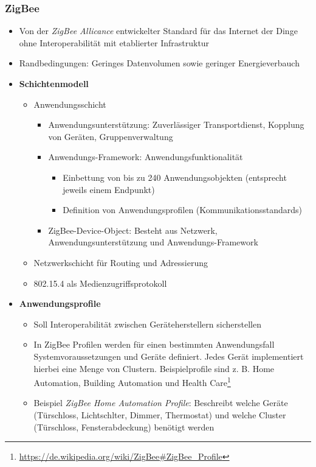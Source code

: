 \subsubsection{ZigBee}
\begin{itemize}
	\item Von der \textit{ZigBee Allicance} entwickelter Standard für das Internet der Dinge ohne Interoperabilität mit etablierter Infrastruktur
	\item Randbedingungen: Geringes Datenvolumen sowie geringer Energieverbauch
	\item \textbf{Schichtenmodell}
	\begin{itemize}
		\item Anwendungsschicht
		\begin{itemize}
			\item Anwendungsunterstützung: Zuverlässiger Transportdienst, Kopplung von Geräten, Gruppenverwaltung
			\item Anwendungs-Framework: Anwendungsfunktionalität
			\begin{itemize}
				\item Einbettung von bis zu 240 Anwendungsobjekten (entsprecht jeweils einem Endpunkt)
				\item Definition von Anwendungsprofilen (Kommunikationsstandards)
			\end{itemize}
			\item ZigBee-Device-Object: Besteht aus Netzwerk, Anwendungsunterstützung und Anwendungs-Framework
		\end{itemize}
		\item Netzwerkschicht für Routing und Adressierung
		\item 802.15.4 als Medienzugriffsprotokoll
	\end{itemize}
	\item \textbf{Anwendungsprofile}
	\begin{itemize}
		\item Soll Interoperabilität zwischen Geräteherstellern sicherstellen
		\item In ZigBee Profilen werden für einen bestimmten Anwendungsfall Systemvoraussetzungen und Geräte definiert. Jedes Gerät implementiert hierbei eine Menge von Clustern. Beispielprofile sind z. B. Home Automation, Building Automation und Health Care\footnote{\url{https://de.wikipedia.org/wiki/ZigBee\#ZigBee_Profile}}
		\item Beispiel \textit{ZigBee Home Automation Profile}: Beschreibt welche Geräte (Türschloss, Lichtschlter, Dimmer, Thermostat) und welche Cluster (Türschloss, Fensterabdeckung) benötigt werden

\end{itemize}
\end{itemize}
